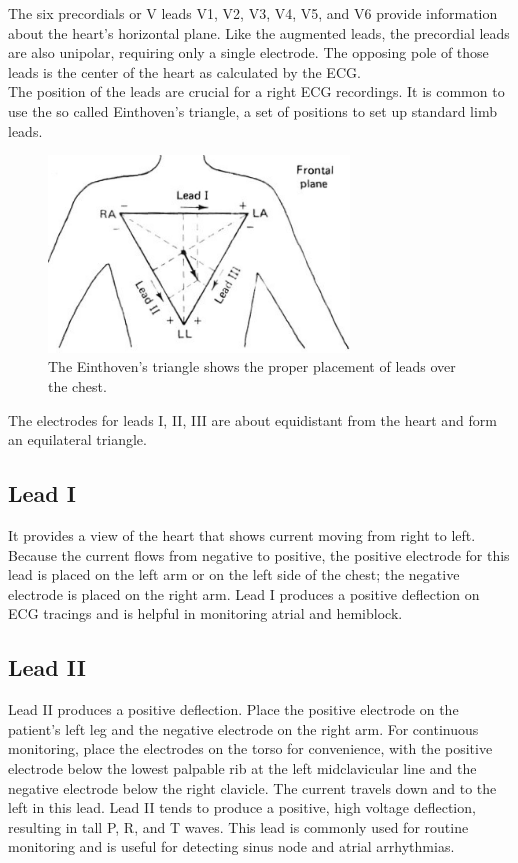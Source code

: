 The six precordials or V leads V1, V2, V3, V4, V5, and V6 provide information about the heart’s horizontal plane. Like the augmented leads, the precordial leads are also unipolar, requiring only a single electrode. The opposing pole of those leads is the center of the heart as calculated by the ECG.\\
The position of the leads are crucial for a right ECG recordings. It is common to use the so called Einthoven’s triangle, a set of positions to set up standard limb leads.
\begin{figure}[ht!]
	\centering
	\includegraphics[width=80mm]{figures/ch2/6.png}
	\caption{The Einthoven's triangle shows the proper placement of leads over the chest.}
	\label{fig2.6}
\end{figure}
The electrodes for leads I, II, III are about equidistant from the heart and form an equilateral triangle.

\subsection{Lead I}
It provides a view of the heart that shows current moving from right to left. Because the current flows from negative to positive, the positive electrode for this lead is placed on the left arm or on the left side of the chest; the negative electrode is placed on the right arm. Lead I produces a positive deflection on ECG tracings and is helpful in monitoring atrial and hemiblock.

\subsection{Lead II}
Lead II produces a positive deflection. Place the positive electrode on the patient’s left leg and the negative electrode on the right arm. For continuous monitoring, place the electrodes on the torso for convenience, with the positive electrode below the lowest palpable rib at the left midclavicular line and the negative electrode below the right clavicle. The current travels down and to the left in this lead. Lead II tends to produce a positive, high voltage deflection, resulting in tall P, R, and T waves. This lead is commonly used for routine monitoring and is useful for detecting sinus node and atrial arrhythmias.

